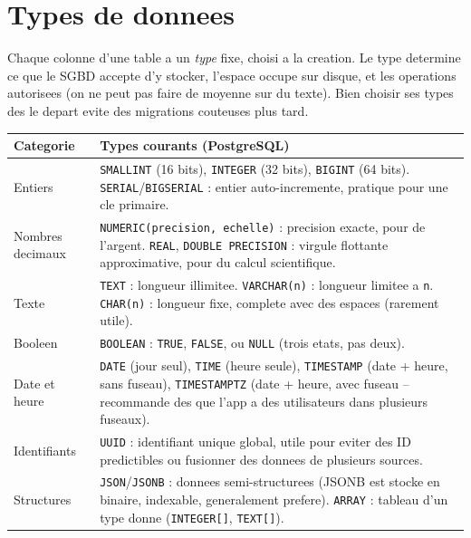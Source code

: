 \documentclass[11pt,a4paper]{article}
\begin{document}
\section{Types de donnees}
Chaque colonne d'une table a un \emph{type} fixe, choisi a la creation. Le type
determine ce que le SGBD accepte d'y stocker, l'espace occupe sur disque, et les
operations autorisees (on ne peut pas faire de moyenne sur du texte). Bien
choisir ses types des le depart evite des migrations couteuses plus tard.

\begin{longtable}{>{\raggedright\arraybackslash}p{3.6cm}
                  >{\raggedright\arraybackslash}p{9.2cm}}
\rowcolor{primary}
\textbf{\color{white}Categorie} & \textbf{\color{white}Types courants (PostgreSQL)} \\
\hline
Entiers & \texttt{SMALLINT} (16 bits), \texttt{INTEGER} (32 bits),
\texttt{BIGINT} (64 bits). \texttt{SERIAL}/\texttt{BIGSERIAL} : entier
auto-incremente, pratique pour une cle primaire. \\
Nombres decimaux & \texttt{NUMERIC(precision, echelle)} : precision exacte,
pour de l'argent. \texttt{REAL}, \texttt{DOUBLE PRECISION} : virgule flottante
approximative, pour du calcul scientifique. \\
Texte & \texttt{TEXT} : longueur illimitee. \texttt{VARCHAR(n)} : longueur
limitee a \texttt{n}. \texttt{CHAR(n)} : longueur fixe, complete avec des
espaces (rarement utile). \\
Booleen & \texttt{BOOLEAN} : \texttt{TRUE}, \texttt{FALSE}, ou \texttt{NULL}
(trois etats, pas deux). \\
Date et heure & \texttt{DATE} (jour seul), \texttt{TIME} (heure seule),
\texttt{TIMESTAMP} (date + heure, sans fuseau), \texttt{TIMESTAMPTZ}
(date + heure, avec fuseau -- recommande des que l'app a des utilisateurs
dans plusieurs fuseaux). \\
Identifiants & \texttt{UUID} : identifiant unique global, utile pour eviter
des ID predictibles ou fusionner des donnees de plusieurs sources. \\
Structures & \texttt{JSON}/\texttt{JSONB} : donnees semi-structurees (JSONB
est stocke en binaire, indexable, generalement prefere). \texttt{ARRAY} :
tableau d'un type donne (\texttt{INTEGER[]}, \texttt{TEXT[]}). \\
\end{longtable}
\end{document}
